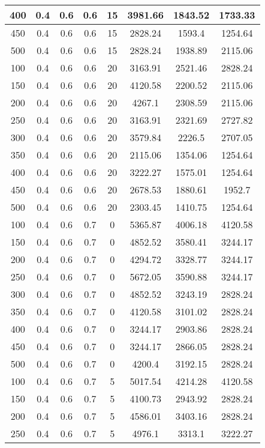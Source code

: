 \documentclass[a4paper, 12pt]{extreport}
\begin{document}
\begin{itemize}
\begin{longtable}{|c|c|c|c|c|c|c|c|}
			400 & 0.4 & 0.6 & 0.6 & 15 & 3981.66 & 1843.52 & 1733.33 \\\hline
			450 & 0.4 & 0.6 & 0.6 & 15 & 2828.24 & 1593.4 & 1254.64 \\\hline
			500 & 0.4 & 0.6 & 0.6 & 15 & 2828.24 & 1938.89 & 2115.06 \\\hline
			100 & 0.4 & 0.6 & 0.6 & 20 & 3163.91 & 2521.46 & 2828.24 \\\hline
			150 & 0.4 & 0.6 & 0.6 & 20 & 4120.58 & 2200.52 & 2115.06 \\\hline
			200 & 0.4 & 0.6 & 0.6 & 20 & 4267.1 & 2308.59 & 2115.06 \\\hline
			250 & 0.4 & 0.6 & 0.6 & 20 & 3163.91 & 2321.69 & 2727.82 \\\hline
			300 & 0.4 & 0.6 & 0.6 & 20 & 3579.84 & 2226.5 & 2707.05 \\\hline
			350 & 0.4 & 0.6 & 0.6 & 20 & 2115.06 & 1354.06 & 1254.64 \\\hline
			400 & 0.4 & 0.6 & 0.6 & 20 & 3222.27 & 1575.01 & 1254.64 \\\hline
			450 & 0.4 & 0.6 & 0.6 & 20 & 2678.53 & 1880.61 & 1952.7 \\\hline
			500 & 0.4 & 0.6 & 0.6 & 20 & 2303.45 & 1410.75 & 1254.64 \\\hline
			100 & 0.4 & 0.6 & 0.7 & 0 & 5365.87 & 4006.18 & 4120.58 \\\hline
			150 & 0.4 & 0.6 & 0.7 & 0 & 4852.52 & 3580.41 & 3244.17 \\\hline
			200 & 0.4 & 0.6 & 0.7 & 0 & 4294.72 & 3328.77 & 3244.17 \\\hline
			250 & 0.4 & 0.6 & 0.7 & 0 & 5672.05 & 3590.88 & 3244.17 \\\hline
			300 & 0.4 & 0.6 & 0.7 & 0 & 4852.52 & 3243.19 & 2828.24 \\\hline
			350 & 0.4 & 0.6 & 0.7 & 0 & 4120.58 & 3101.02 & 2828.24 \\\hline
			400 & 0.4 & 0.6 & 0.7 & 0 & 3244.17 & 2903.86 & 2828.24 \\\hline
			450 & 0.4 & 0.6 & 0.7 & 0 & 3244.17 & 2866.05 & 2828.24 \\\hline
			500 & 0.4 & 0.6 & 0.7 & 0 & 4200.4 & 3192.15 & 2828.24 \\\hline
			100 & 0.4 & 0.6 & 0.7 & 5 & 5017.54 & 4214.28 & 4120.58 \\\hline
			150 & 0.4 & 0.6 & 0.7 & 5 & 4100.73 & 2943.92 & 2828.24 \\\hline
			200 & 0.4 & 0.6 & 0.7 & 5 & 4586.01 & 3403.16 & 2828.24 \\\hline
			250 & 0.4 & 0.6 & 0.7 & 5 & 4976.1 & 3313.1 & 3222.27 \\\hline

\end{longtable}
\end{itemize}
\end{document}
